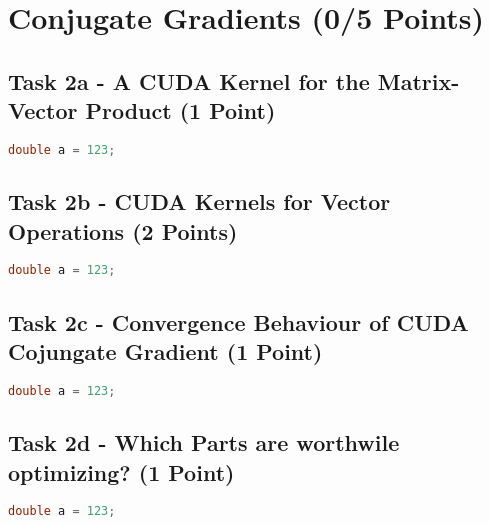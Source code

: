 \section{Conjugate Gradients (0/5 Points)}

\subsection{Task 2a - A CUDA Kernel for the Matrix-Vector Product (1 Point)}

\begin{lstlisting}[language=C++, title=C++ Cuda Code for 1a Kernel]
  double a = 123;
  \end{lstlisting}

\pagebreak


\subsection{Task 2b - CUDA Kernels for Vector Operations (2 Points)}

\begin{lstlisting}[language=C++, title=C++ Cuda Code for 1a Kernel]
  double a = 123;
  \end{lstlisting}

\pagebreak

\subsection{Task 2c - Convergence Behaviour of CUDA Cojungate Gradient (1 Point)}

\begin{lstlisting}[language=C++, title=C++ Cuda Code for 1a Kernel]
  double a = 123;
  \end{lstlisting}

\pagebreak

\subsection{Task 2d - Which Parts are worthwile optimizing? (1 Point)}

\begin{lstlisting}[language=C++, title=C++ Cuda Code for 1a Kernel]
  double a = 123;
  \end{lstlisting}

\pagebreak